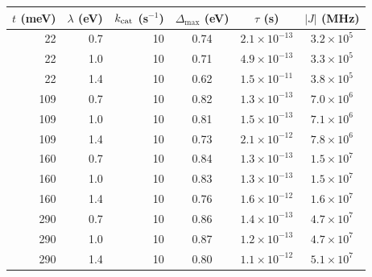 \begin{tabular}{rrrccc}
\toprule
$t$ (meV) & $\lambda$ (eV) & $k_{\rm cat}$ (s$^{-1}$) & $\Delta_{\max}$ (eV) & $\tau$ (s) & $|J|$ (MHz) \\
\midrule
22 & 0.7 & 10 & 0.74 & $\ensuremath{2.1\times10^{-13}}$ & $\ensuremath{3.2\times10^{5}}$ \\
22 & 1.0 & 10 & 0.71 & $\ensuremath{4.9\times10^{-13}}$ & $\ensuremath{3.3\times10^{5}}$ \\
22 & 1.4 & 10 & 0.62 & $\ensuremath{1.5\times10^{-11}}$ & $\ensuremath{3.8\times10^{5}}$ \\
109 & 0.7 & 10 & 0.82 & $\ensuremath{1.3\times10^{-13}}$ & $\ensuremath{7.0\times10^{6}}$ \\
109 & 1.0 & 10 & 0.81 & $\ensuremath{1.5\times10^{-13}}$ & $\ensuremath{7.1\times10^{6}}$ \\
109 & 1.4 & 10 & 0.73 & $\ensuremath{2.1\times10^{-12}}$ & $\ensuremath{7.8\times10^{6}}$ \\
160 & 0.7 & 10 & 0.84 & $\ensuremath{1.3\times10^{-13}}$ & $\ensuremath{1.5\times10^{7}}$ \\
160 & 1.0 & 10 & 0.83 & $\ensuremath{1.3\times10^{-13}}$ & $\ensuremath{1.5\times10^{7}}$ \\
160 & 1.4 & 10 & 0.76 & $\ensuremath{1.6\times10^{-12}}$ & $\ensuremath{1.6\times10^{7}}$ \\
290 & 0.7 & 10 & 0.86 & $\ensuremath{1.4\times10^{-13}}$ & $\ensuremath{4.7\times10^{7}}$ \\
290 & 1.0 & 10 & 0.87 & $\ensuremath{1.2\times10^{-13}}$ & $\ensuremath{4.7\times10^{7}}$ \\
290 & 1.4 & 10 & 0.80 & $\ensuremath{1.1\times10^{-12}}$ & $\ensuremath{5.1\times10^{7}}$ \\
\bottomrule
\end{tabular}
